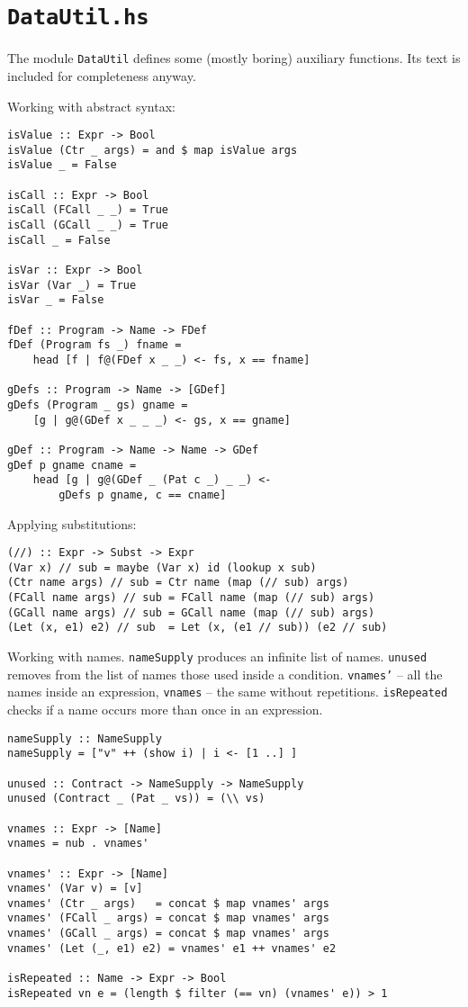 \section{\texttt{DataUtil.hs}}

The module \texttt{DataUtil} defines some (mostly boring) auxiliary functions. 
Its text is included for completeness anyway.

Working with abstract syntax:
\begin{lstlisting}[name=datautil]
isValue :: Expr -> Bool
isValue (Ctr _ args) = and $ map isValue args
isValue _ = False

isCall :: Expr -> Bool
isCall (FCall _ _) = True
isCall (GCall _ _) = True
isCall _ = False

isVar :: Expr -> Bool
isVar (Var _) = True
isVar _ = False

fDef :: Program -> Name -> FDef
fDef (Program fs _) fname = 
	head [f | f@(FDef x _ _) <- fs, x == fname]

gDefs :: Program -> Name -> [GDef]
gDefs (Program _ gs) gname = 
	[g | g@(GDef x _ _ _) <- gs, x == gname]

gDef :: Program -> Name -> Name -> GDef
gDef p gname cname = 
	head [g | g@(GDef _ (Pat c _) _ _) <- 
		gDefs p gname, c == cname]
\end{lstlisting}

Applying substitutions:
\begin{lstlisting}[name=datautil]
(//) :: Expr -> Subst -> Expr
(Var x) // sub = maybe (Var x) id (lookup x sub)
(Ctr name args) // sub = Ctr name (map (// sub) args)
(FCall name args) // sub = FCall name (map (// sub) args)
(GCall name args) // sub = GCall name (map (// sub) args)
(Let (x, e1) e2) // sub  = Let (x, (e1 // sub)) (e2 // sub)
\end{lstlisting}

Working with names.
\texttt{nameSupply} produces an infinite list of names. 
\texttt{unused} removes from the list of names those used inside a condition.
\texttt{vnames'} -- all the names inside an expression, \texttt{vnames} -- the same without repetitions. 
\texttt{isRepeated} checks if a name occurs more than once in an expression.
\begin{lstlisting}[name=datautil]
nameSupply :: NameSupply
nameSupply = ["v" ++ (show i) | i <- [1 ..] ]

unused :: Contract -> NameSupply -> NameSupply
unused (Contract _ (Pat _ vs)) = (\\ vs)

vnames :: Expr -> [Name]
vnames = nub . vnames'

vnames' :: Expr -> [Name]
vnames' (Var v) = [v]
vnames' (Ctr _ args)   = concat $ map vnames' args
vnames' (FCall _ args) = concat $ map vnames' args
vnames' (GCall _ args) = concat $ map vnames' args
vnames' (Let (_, e1) e2) = vnames' e1 ++ vnames' e2

isRepeated :: Name -> Expr -> Bool
isRepeated vn e = (length $ filter (== vn) (vnames' e)) > 1
\end{lstlisting}


